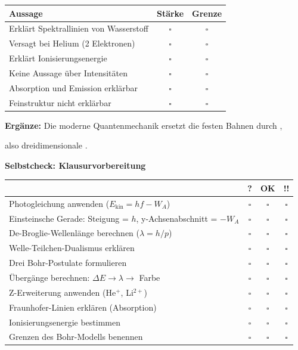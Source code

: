 \documentclass[11pt,a4paper]{article}
\newcommand{\aufgabe}[1]{\textbf{\textcolor{physik}{#1}}}
\newcommand{\luecke}[1]{\underline{\hspace{#1}}}
\begin{document}
\vspace{0.3em}
\renewcommand{\arraystretch}{1.5}
\begin{tabular}{|p{7cm}|c|c|}
\hline
\textbf{Aussage} & \textbf{St\"arke} & \textbf{Grenze} \\
\hline
Erkl\"art Spektrallinien von Wasserstoff & $\square$ & $\square$ \\
\hline
Versagt bei Helium (2 Elektronen) & $\square$ & $\square$ \\
\hline
Erkl\"art Ionisierungsenergie & $\square$ & $\square$ \\
\hline
Keine Aussage \"uber Intensit\"aten & $\square$ & $\square$ \\
\hline
Absorption und Emission erkl\"arbar & $\square$ & $\square$ \\
\hline
Feinstruktur nicht erkl\"arbar & $\square$ & $\square$ \\
\hline
\end{tabular}

\vspace{0.5em}
\textbf{Erg\"anze:} Die moderne Quantenmechanik ersetzt die festen Bahnen durch \luecke{3cm},

also dreidimensionale \luecke{5cm}.

\vspace{0.5em}

\aufgabe{Selbstcheck: Klausurvorbereitung}

\vspace{0.3em}
\renewcommand{\arraystretch}{1.3}
\begin{tabular}{|p{10.5cm}|c|c|c|}
\hline
& \textbf{?} & \textbf{OK} & \textbf{!!} \\
\hline
Photogleichung anwenden ($E_\text{kin} = hf - W_A$) & $\square$ & $\square$ & $\square$ \\
\hline
Einsteinsche Gerade: Steigung = $h$, y-Achsenabschnitt = $-W_A$ & $\square$ & $\square$ & $\square$ \\
\hline
De-Broglie-Wellenl\"ange berechnen ($\lambda = h/p$) & $\square$ & $\square$ & $\square$ \\
\hline
Welle-Teilchen-Dualismus erkl\"aren & $\square$ & $\square$ & $\square$ \\
\hline
Drei Bohr-Postulate formulieren & $\square$ & $\square$ & $\square$ \\
\hline
\"Uberg\"ange berechnen: $\Delta E \to \lambda \to$ Farbe & $\square$ & $\square$ & $\square$ \\
\hline
Z-Erweiterung anwenden (He$^+$, Li$^{2+}$) & $\square$ & $\square$ & $\square$ \\
\hline
Fraunhofer-Linien erkl\"aren (Absorption) & $\square$ & $\square$ & $\square$ \\
\hline
Ionisierungsenergie bestimmen & $\square$ & $\square$ & $\square$ \\
\hline
Grenzen des Bohr-Modells benennen & $\square$ & $\square$ & $\square$ \\
\hline
\end{tabular}
\end{document}

